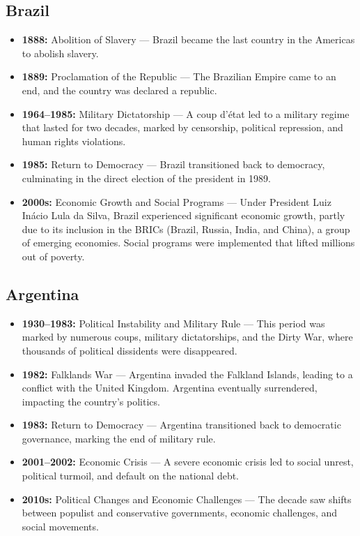 \documentclass[a4paper,12pt]{book}
\begin{document}
\subsection{Brazil}
\label{subsec:brazil}
\begin{itemize}
    \item \textbf{1888:} Abolition of Slavery — Brazil became the last country in the Americas to abolish slavery.
    \item \textbf{1889:} Proclamation of the Republic — The Brazilian Empire came to an end, and the country was declared a republic.
    \item \textbf{1964–1985:} Military Dictatorship — A coup d'état led to a military regime that lasted for two decades, marked by censorship, political repression, and human rights violations.
    \item \textbf{1985:} Return to Democracy — Brazil transitioned back to democracy, culminating in the direct election of the president in 1989.
    \item \textbf{2000s:} Economic Growth and Social Programs — Under President Luiz Inácio Lula da Silva, Brazil experienced significant economic growth, partly due to its inclusion in the BRICs (Brazil, Russia, India, and China), a group of emerging economies. Social programs were implemented that lifted millions out of poverty.
\end{itemize}

\subsection{Argentina}
\label{subsec:argentina}
\begin{itemize}
    \item \textbf{1930–1983:} Political Instability and Military Rule — This period was marked by numerous coups, military dictatorships, and the Dirty War, where thousands of political dissidents were disappeared.
    \item \textbf{1982:} Falklands War — Argentina invaded the Falkland Islands, leading to a conflict with the United Kingdom. Argentina eventually surrendered, impacting the country’s politics.
    \item \textbf{1983:} Return to Democracy — Argentina transitioned back to democratic governance, marking the end of military rule.
    \item \textbf{2001–2002:} Economic Crisis — A severe economic crisis led to social unrest, political turmoil, and default on the national debt.
    \item \textbf{2010s:} Political Changes and Economic Challenges — The decade saw shifts between populist and conservative governments, economic challenges, and social movements.
\end{itemize}
\end{document}
